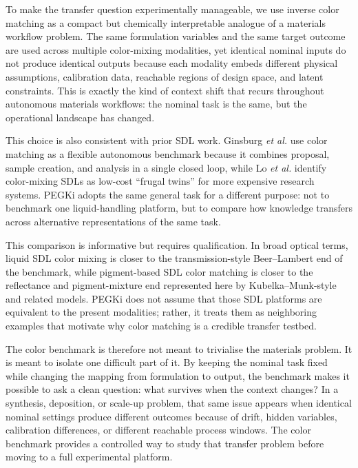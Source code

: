 \documentclass[twoside,twocolumn,9pt]{article}
\begin{document}
To make the transfer question experimentally manageable, we use inverse color matching as a compact but chemically interpretable analogue of a materials workflow problem. The same formulation variables and the same target outcome are used across multiple color-mixing modalities, yet identical nominal inputs do not produce identical outputs because each modality embeds different physical assumptions, calibration data, reachable regions of design space, and latent constraints. This is exactly the kind of context shift that recurs throughout autonomous materials workflows: the nominal task is the same, but the operational landscape has changed.

This choice is also consistent with prior SDL work. Ginsburg \emph{et al.} use color matching as a flexible autonomous benchmark because it combines proposal, sample creation, and analysis in a single closed loop,\cite{Ginsburg2023ExploringBenchmarks} while Lo \emph{et al.} identify color-mixing SDLs as low-cost ``frugal twins'' for more expensive research systems.\cite{Lo2024FrugalTwin} PEGKi adopts the same general task for a different purpose: not to benchmark one liquid-handling platform, but to compare how knowledge transfers across alternative representations of the same task.

This comparison is informative but requires qualification. In broad optical terms, liquid SDL color mixing is closer to the transmission-style Beer--Lambert end of the benchmark, while pigment-based SDL color matching is closer to the reflectance and pigment-mixture end represented here by Kubelka--Munk-style and related models. PEGKi does not assume that those SDL platforms are equivalent to the present modalities; rather, it treats them as neighboring examples that motivate why color matching is a credible transfer testbed.

The color benchmark is therefore not meant to trivialise the materials problem. It is meant to isolate one difficult part of it. By keeping the nominal task fixed while changing the mapping from formulation to output, the benchmark makes it possible to ask a clean question: what survives when the context changes? In a synthesis, deposition, or scale-up problem, that same issue appears when identical nominal settings produce different outcomes because of drift, hidden variables, calibration differences, or different reachable process windows. The color benchmark provides a controlled way to study that transfer problem before moving to a full experimental platform.
\end{document}
